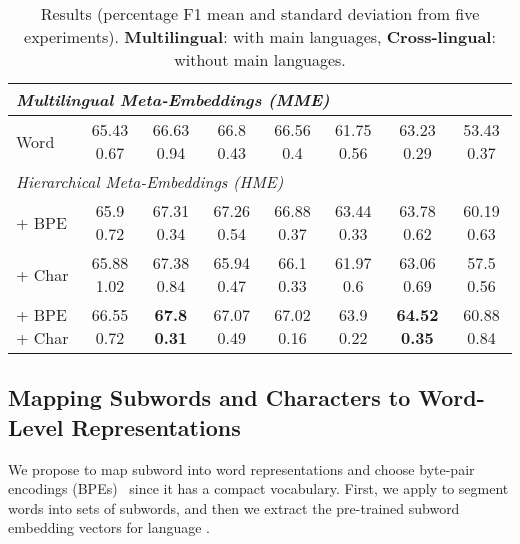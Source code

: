 \documentclass[11pt,a4paper]{article}
\begin{document}
\begin{table*}[!t]
{\begin{tabular}{llllllll}
\multicolumn{8}{l}{\textit{Multilingual Meta-Embeddings (MME)} \cite{winata2019learning}} \\ \hline
\multicolumn{1}{l|}{Word} &
\multicolumn{1}{c|}{65.43 \small{ 0.67}} & \multicolumn{1}{c|}{66.63 \small{ 0.94}} & 
\multicolumn{1}{c|}{66.8 \small{ 0.43}} & \multicolumn{1}{c|}{66.56 \small{ 0.4}} & \multicolumn{1}{c|}{61.75 \small{ 0.56}} & \multicolumn{1}{c|}{63.23 \small{ 0.29}} & \multicolumn{1}{c}{53.43 \small{ 0.37}} \\ \hline  
\multicolumn{8}{l}{\textit{Hierarchical Meta-Embeddings (HME)}} \\ \hline
\multicolumn{1}{l|}{+ BPE} & \multicolumn{1}{c|}{65.9 \small{ 0.72}} & \multicolumn{1}{c|}{67.31 \small{ 0.34}} & \multicolumn{1}{c|}{67.26 \small{ 0.54}} & \multicolumn{1}{c|}{66.88 \small{ 0.37}} & \multicolumn{1}{c|}{63.44 \small{ 0.33}} & \multicolumn{1}{c|}{63.78 \small{ 0.62}} & \multicolumn{1}{c}{60.19 \small{ 0.63}}\\
\multicolumn{1}{l|}{+ Char} & \multicolumn{1}{c|}{65.88 \small{ 1.02}} & \multicolumn{1}{c|}{67.38 \small{ 0.84}} & \multicolumn{1}{c|}{65.94 \small{ 0.47}} & 
\multicolumn{1}{c|}{66.1 \small{ 0.33}} & 
\multicolumn{1}{c|}{61.97 \small{ 0.6}} & 
\multicolumn{1}{c|}{63.06 \small{ 0.69}} & 
\multicolumn{1}{c}{57.5 \small{ 0.56}}\\
\multicolumn{1}{l|}{+ BPE + Char} & \multicolumn{1}{c|}{66.55 \small{ 0.72}} & \multicolumn{1}{c|}{\textbf{67.8 \small{ 0.31}}} & \multicolumn{1}{c|}{67.07 \small{ 0.49}} & \multicolumn{1}{c|}{67.02 \small{ 0.16}} & \multicolumn{1}{c|}{63.9 \small{ 0.22}} & \multicolumn{1}{c|}{ \textbf{64.52 \small{ 0.35 }}} & \multicolumn{1}{c}{60.88 \small{ 0.84}} \\ \hline
\end{tabular}
}
\caption{Results (percentage F1 mean and standard deviation from five experiments). \textbf{Multilingual}: with main languages, \textbf{Cross-lingual}: without main languages. }
\label{tab:res}
\end{table*}

\subsection{Mapping Subwords and Characters to Word-Level Representations} 
We propose to map subword into word representations and choose byte-pair encodings (BPEs)~\cite{sennrich2016neural} since it has a compact vocabulary. First, we apply  to segment words into sets of subwords, and then we extract the pre-trained subword embedding vectors  for language .
\end{document}
